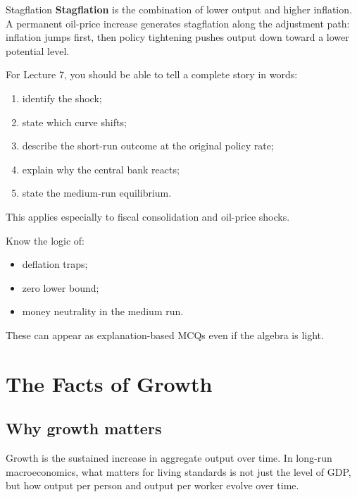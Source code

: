 \documentclass[12pt]{article}
\begin{document}
\begin{definition}{Stagflation}{}
\textbf{Stagflation} is the combination of lower output and higher inflation. A permanent oil-price increase generates stagflation along the adjustment path: inflation jumps first, then policy tightening pushes output down toward a lower potential level.
\end{definition}

\begin{examtip}[title={Exam Focus: High priority for short-answer}]
For Lecture 7, you should be able to tell a complete story in words:
\begin{enumerate}[leftmargin=1.5em]
\item identify the shock;
\item state which curve shifts;
\item describe the short-run outcome at the original policy rate;
\item explain why the central bank reacts;
\item state the medium-run equilibrium.
\end{enumerate}
This applies especially to fiscal consolidation and oil-price shocks.
\end{examtip}

\begin{examtip}[title={Exam Focus: Likely conceptual / recognition}]
Know the logic of:
\begin{itemize}[leftmargin=1.5em]
\item deflation traps;
\item zero lower bound;
\item money neutrality in the medium run.
\end{itemize}
These can appear as explanation-based MCQs even if the algebra is light.
\end{examtip}

\newpage


\section{The Facts of Growth}

\subsection{Why growth matters}

Growth is the sustained increase in aggregate output over time. In long-run macroeconomics, what matters for living standards is not just the level of GDP, but how output per person and output per worker evolve over time.
\end{document}
